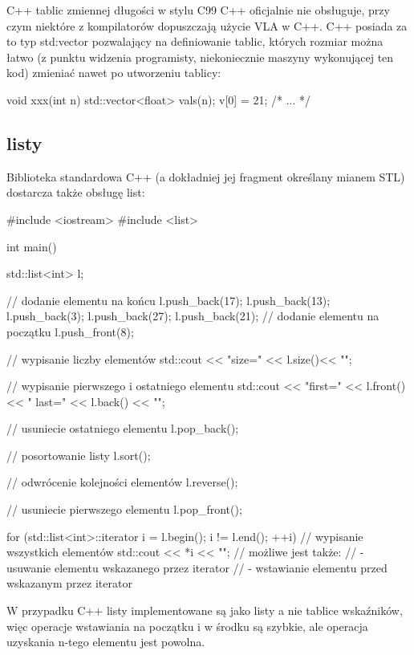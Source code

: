C++ tablic zmiennej długości w stylu C99 C++ oficjalnie nie obsługuje, przy czym niektóre z kompilatorów dopuszczają użycie VLA w C++.
C++ posiada za to typ std:vector pozwalający na definiowanie tablic, których rozmiar można łatwo (z punktu widzenia programisty, niekoniecznie maszyny wykonującej ten kod) zmieniać nawet po utworzeniu tablicy:
\begin{CodeFrame*}[cpp]{}
void xxx(int n) {
    std::vector<float> vals(n);
    v[0] = 21;
    /* ... */
}
\end{CodeFrame*}


\subsection{listy}

Biblioteka standardowa C++ (a dokładniej jej fragment określany mianem STL) dostarcza także obsługę list:

\begin{CodeFrame*}[cpp]{}
#include <iostream>
#include <list>

int main() {
    std::list<int> l;
    
    // dodanie elementu na końcu
    l.push_back(17);
    l.push_back(13);
    l.push_back(3);
    l.push_back(27);
    l.push_back(21);
    // dodanie elementu na początku
    l.push_front(8);
    
    // wypisanie liczby elementów
    std::cout << "size=" << l.size()<< "\n";
    
    // wypisanie pierwszego i ostatniego elementu
    std::cout << "first=" << l.front() << " last=" << l.back() << "\n";
    
    // usuniecie ostatniego elementu
    l.pop_back();
    
    // posortowanie listy
    l.sort();
    
    // odwrócenie kolejności elementów
    l.reverse();
    
    // usuniecie pierwszego elementu
    l.pop_front();
    
    for (std::list<int>::iterator i = l.begin(); i != l.end(); ++i) {
        // wypisanie wszystkich elementów
        std::cout << *i << "\n";
        // możliwe jest także:
        //  - usuwanie elementu wskazanego przez iterator
        //  - wstawianie elementu przed wskazanym przez iterator
    }
}
\end{CodeFrame*}

W przypadku C++ listy implementowane są jako listy a nie tablice wskaźników, więc operacje wstawiania na początku i w środku są szybkie, ale operacja uzyskania n-tego elementu jest powolna.

